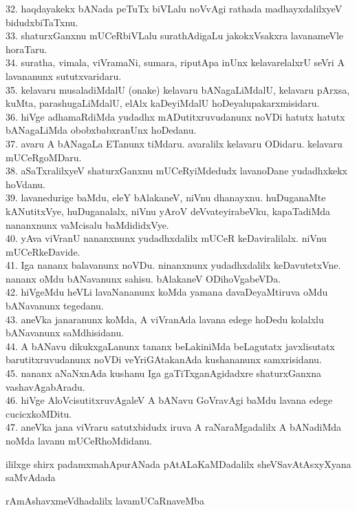 \documentclass{article}
\begin{document}
32. haqdayakekx bANada peTuTx biVLalu noVvAgi rathada madhayxdalilxyeV bidudxbiTaTxnu.\\
33. shaturxGanxnu mUCeRbiVLalu surathAdigaLu jakokxVsakxra lavanameVle horaTaru.\\
34. suratha, vimala, viVramaNi, sumara, riputApa inUnx kelavarelalxrU seVri A lavananunx sututxvaridaru.\\
35. kelavaru musaladiMdalU (onake) kelavaru bANagaLiMdalU, kelavaru pArxsa, kuMta, parashugaLiMdalU, elAlx kaDeyiMdalU hoDeyalupakarxmisidaru.\\
36. hiVge adhamaRdiMda yudadhx mADutitxruvudanunx noVDi hatutx hatutx bANagaLiMda obobxbabxranUnx hoDedanu.\\
37. avaru A bANagaLa ETanunx tiMdaru. avaralilx kelavaru ODidaru. kelavaru mUCeRgoMDaru.\\
38. aSaTxralilxyeV shaturxGanxnu mUCeRyiMdedudx lavanoDane yudadhxkekx hoVdanu.\\
39. lavanedurige baMdu, eleY bAlakaneV, niVnu dhanayxnu. huDuganaMte kANutitxVye, huDuganalalx, niVnu yAroV deVvateyirabeVku, kapaTadiMda nananxnunx vaMcisalu baMdididxVye.\\
40. yAva viVranU nananxnunx yudadhxdalilx mUCeR keDaviralilalx. niVnu mUCeRkeDavide.\\
41. Iga nananx balavanunx noVDu. ninanxnunx yudadhxdalilx keDavutetxVne. nananx oMdu bANavanunx sahisu. bAlakaneV ODihoVgabeVDa.\\
42. hiVgeMdu heVLi lavaNananunx koMda yamana davaDeyaMtiruva oMdu bANavanunx tegedanu.\\
43. aneVka janaranunx koMda, A viVranAda lavana edege hoDedu kolalxlu bANavanunx saMdhisidanu.\\
44. A bANavu dikukxgaLanunx tananx beLakiniMda beLagutatx javxlisutatx barutitxruvudanunx noVDi veYriGAtakanAda kushananunx samxrisidanu.\\
45. nananx aNaNxnAda kushanu Iga gaTiTxganAgidadxre shaturxGanxna vashavAgabAradu.\\
46. hiVge AloVcisutitxruvAgaleV A bANavu GoVravAgi baMdu lavana edege cucicxkoMDitu.\\
47. aneVka jana viVraru satutxbidudx iruva A raNaraMgadalilx A bANadiMda noMda lavanu mUCeRhoMdidanu.

\begin{center}
ililxge shirx padamxmahApurANada pAtALaKaMDadalilx sheVSavAtAsxyXyana saMvAdada
\end{center}

\begin{center}
rAmAshavxmeVdhadalilx lavamUCaRnaveMba
\end{center}
\end{document}
